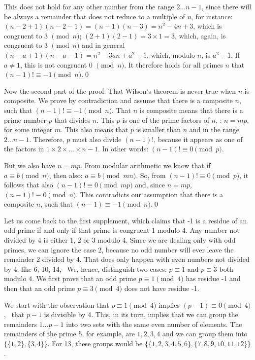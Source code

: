 \documentclass{scrreprt}
\begin{document}
This does not hold for any other number from the range $2\dots n-1$,
since there will be always a remainder that does not reduce
to a multiple of $n$, for instance:
$(n - 2 + 1) (n - 2 - 1) = (n - 1) (n - 3) = n^2 - 4n + 3$,
which is congruent to 3 $\pmod{n}$;
$(2 + 1) (2 - 1) = 3 \times 1 = 3$, which, again, 
is congruent to 3 $\pmod{n}$ and in general
$(n - a + 1)(n - a - 1) = n^2 - 3an + a^2 - 1$,
which, modulo $n$, is $a^2 - 1$.
If $a \neq 1$, this is not congruent 0 $\pmod{n}$.
It therefore holds for all primes $n$ 
that $(n - 1)! \equiv -1 \pmod{n}$.\qed

Now the second part of the proof:
That Wilson's theorem is never true when $n$ is composite.
We prove by contradiction and assume that there is a composite $n$,
such that $(n-1)! \equiv -1 \pmod{n}$.
That $n$ is composite means that there is a prime number $p$
that divides $n$.
This $p$ is one of the prime factors of $n$,
\ie: $n = mp$, for some integer $m$.
This also means that $p$ is smaller than $n$ and 
in the range $2\dots n-1$.
Therefore, $p$ must also divide $(n-1)!$, because 
it appears as one of the factors in $1 \times 2 \times \dots \times n-1$.
In other words: $(n-1)! \equiv 0 \pmod{p}$.

But we also have $n = mp$.
From modular arithmetic we know that 
if $a \equiv b \pmod{n}$, then also: $a \equiv b \pmod{mn}$.
So, from $(n-1)! \equiv 0 \pmod{p}$, it follows that also
$(n-1)! \equiv 0 \pmod{mp}$ and, since $n = mp$,
$(n-1)! \equiv 0 \pmod{n}$. This contradicts our assumption
that there is a composite $n$, such that
$(n-1) \equiv -1 \pmod{n}$.\qed

Let us come back to the first supplement,
which claims that -1 is a residue of an odd prime
if and only if that prime is congruent 1 modulo 4.
Any number not divided by 4
is either 1, 2 or 3 modulo 4.
Since we are dealing only with odd primes,
we can ignore the case 2, because
no odd number will ever leave the remainder 2
divided by 4. That does only happen with even
numbers not divided by 4, like 6, 10, 14, \etc\
We, hence, distinguish two cases: 
$p \equiv 1$ and $p \equiv 3$ both modulo 4.
We first prove that an odd prime
$p \equiv 1 \pmod{4}$ has residue -1 and then
that an odd prime $p \equiv 3 \pmod{4}$
does not have residue -1.

We start with the observation that
$p \equiv 1 \pmod{4}$ implies 
$(p - 1) \equiv 0 \pmod{4}$, \ie\ that
$p-1$ is divisible by 4.
This, in its turn, implies
that we can group the remainders $1\dots p-1$
into two sets with the same even number of elements.
The remainders of the prime 5, for example,
are $1,2,3,4$ and we can group them into
$\lbrace\lbrace 1,2\rbrace, \lbrace 3,4\rbrace\rbrace$.
For 13, these groups would be
$\lbrace\lbrace 1,2,3,4,5,6\rbrace, \lbrace 7,8,9,10,11,12\rbrace\rbrace$.
\end{document}
